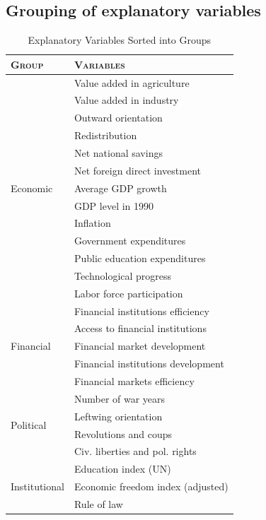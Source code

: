 \documentclass[a4paper,11pt]{article}
\begin{document}
\subsection*{Grouping of explanatory variables}
\begin{table}[ht!]
	\footnotesize
	\caption{Explanatory Variables Sorted into Groups}
	\label{tab:groups}
	\centering
	\begin{tabular}{ll}
		\toprule
		\textsc{Group} & \textsc{Variables} \\
		\midrule
		\multirow{13}{*}{Economic}   & Value added in agriculture \\
		& Value added in industry \\
		& Outward orientation \\
		& Redistribution \\
		& Net national savings  \\
		& Net foreign direct investment \\
		& Average GDP growth \\
		& GDP level in 1990 \\
		& Inflation \\
		& Government expenditures \\
		& Public education expenditures \\
		& Technological progress \\
		& Labor force participation \\
		
		\midrule
		\multirow{5}{*}{Financial}   & Financial institutions efficiency \\
		& Access to financial institutions  \\ 
		& Financial market development \\
		& Financial institutions development \\
		& Financial markets efficiency \\
		
		\midrule
		\multirow{4}{*}{Political}  & Number of war years  \\
		& Leftwing orientation \\
		& Revolutions and coups \\
		& Civ. liberties and pol. rights \\
		
		\midrule
		\multirow{3}{*}{Institutional}  & Education index (UN) \\
		& Economic freedom index (adjusted) \\
		& Rule of law \\
		

\end{tabular}
\end{table}
\end{document}
